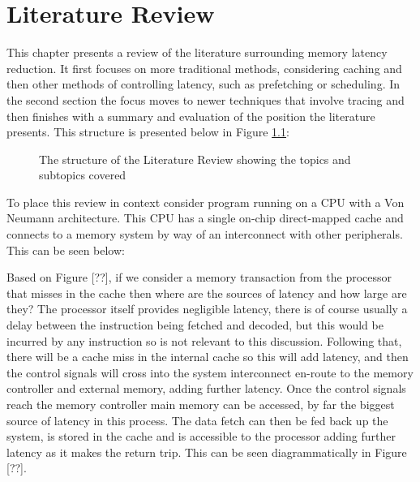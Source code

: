 
\chapter{Literature Review}

This chapter presents a review of the literature surrounding memory latency reduction. It first focuses on more traditional methods, considering caching and then other methods of controlling latency, such as prefetching or scheduling. In the second section the focus moves to newer techniques that involve tracing and then finishes with a summary and evaluation of the position the literature presents. This structure is presented below in Figure \ref{fig:lit-review-schematic}:

\begin{figure}[h]
		\centering
		\label{fig:lit-review-schematic}
		
		\caption[Literature Review Structure]{The structure of the Literature Review showing the topics and subtopics covered}
\end{figure}


To place this review in context consider program running on a CPU with a Von Neumann architecture. This CPU has a single on-chip direct-mapped cache and connects to a memory system by way of an interconnect with other peripherals. This can be seen below:


Based on Figure [??], if we consider a memory transaction from the processor that misses in the cache then where are the sources of latency and how large are they? The processor itself provides negligible latency, there is of course usually a delay between the instruction being fetched and decoded, but this would be incurred by any instruction so is not relevant to this discussion. Following that, there will be a cache miss in the internal cache so this will add latency, and then the control signals will cross into the system interconnect en-route to the memory controller and external memory, adding further latency. Once the control signals reach the memory controller main memory can be accessed, by far the biggest source of latency in this process. The data fetch can then be fed back up the system, is stored in the cache and is accessible to the processor adding further latency as it makes the return trip. This can be seen diagrammatically in Figure [??]. 


